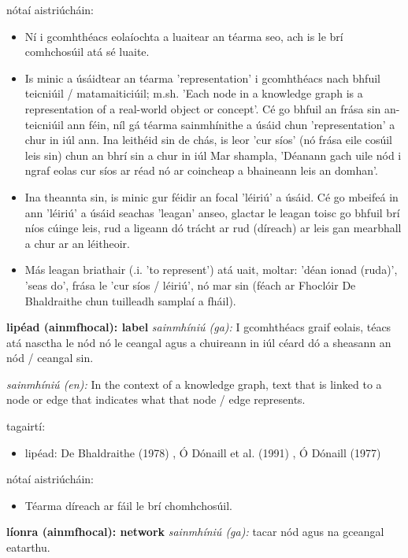 \documentclass{article}
\begin{document}
nótaí aistriúcháin:
\begin{itemize}
	\item Ní i gcomhthéacs eolaíochta a luaitear an téarma seo, ach is le brí comhchosúil atá sé luaite.
	\item Is minic a úsáidtear an téarma 'representation' i gcomhthéacs nach bhfuil teicniúil / matamaiticiúil; m.sh. 'Each node in a knowledge graph is a representation of a real-world object or concept'. Cé go bhfuil an frása sin an-teicniúil ann féin, níl gá téarma sainmhínithe a úsáid chun 'representation' a chur in iúl ann. Ina leithéid sin de chás, is leor 'cur síos' (nó frása eile cosúil leis sin) chun an bhrí sin a chur in iúl Mar shampla, 'Déanann gach uile nód i ngraf eolas cur síos ar réad nó ar coincheap a bhaineann leis an domhan'.
	\item Ina theannta sin, is minic gur féidir an focal 'léiriú' a úsáid. Cé go mbeifeá in ann 'léiriú' a úsáid seachas 'leagan' anseo, glactar le leagan toisc go bhfuil brí níos cúinge leis, rud a ligeann dó trácht ar rud (díreach) ar leis gan mearbhall a chur ar an léitheoir.
	\item Más leagan briathair (.i. 'to represent') atá uait, moltar: 'déan ionad (ruda)', 'seas do', frása le 'cur síos / léiriú', nó mar sin (féach ar Fhoclóir De Bhaldraithe chun tuilleadh samplaí a fháil).
\end{itemize}


\textbf{lipéad (ainmfhocal): label}
\textit{sainmhíniú (ga):} I gcomhthéacs graif eolais, téacs atá nasctha le nód nó le ceangal agus a chuireann in iúl céard dó a sheasann an nód / ceangal sin.

\textit{sainmhíniú (en):} In the context of a knowledge graph, text that is linked to a node or edge that indicates what that node / edge represents.

tagairtí:
\begin{itemize}
	\item lipéad: De Bhaldraithe (1978) \cite{de-bhaldraithe}, Ó Dónaill et al. (1991) \cite{focloir-beag}, Ó Dónaill (1977) \cite{odonaill}
\end{itemize}

nótaí aistriúcháin:
\begin{itemize}
	\item Téarma díreach ar fáil le brí chomhchosúil.
\end{itemize}


\textbf{líonra (ainmfhocal): network}
\textit{sainmhíniú (ga):} tacar nód agus na gceangal eatarthu.
\end{document}
